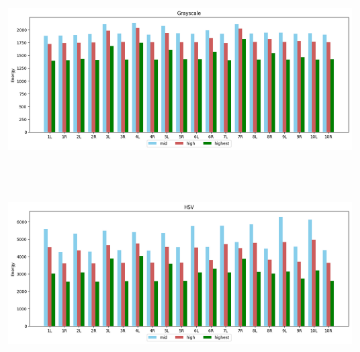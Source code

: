 \begin{figure}[H]
    \caption{Coin "o" STFT approach with Blackmanharris window for Grayscale (a) and HSV (b) colourspaces.}
    \centering
    \begin{subfigure}{\textwidth}
        \centering
        \includegraphics[scale=0.4]{images/appendix/stft/coin_o/flattop_Grayscale.png}
        \caption{}
    \end{subfigure}\\
    \begin{subfigure}{\textwidth}
         \centering
          \includegraphics[scale=0.4]{images/appendix/stft/coin_o/flattop_HSV.png}
          \caption{}
    \end{subfigure}
    \fautor
\end{figure}

